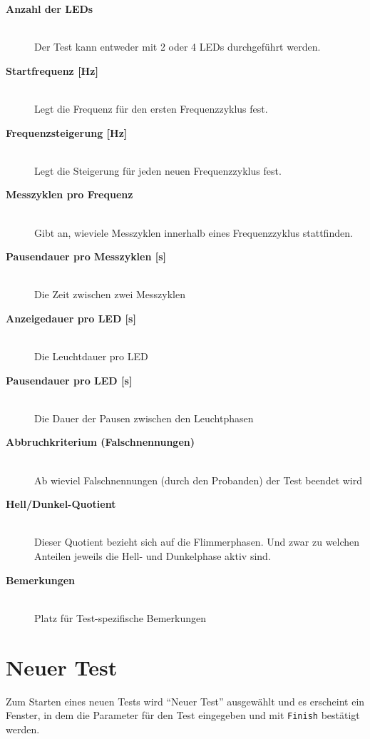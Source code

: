 \documentclass[11pt,accentcolor=tud2a,colorback,noheadingspace]{tudreport}
\begin{document}
\begin{description}
\item[{\textbf{Anzahl der LEDs}}] \hfill \\
Der Test kann entweder mit 2 oder 4 LEDs durchgeführt werden.

\item[{\textbf{Startfrequenz {[}Hz{]}}}] \hfill \\
Legt die Frequenz für den ersten Frequenzzyklus fest.

\item[{\textbf{Frequenzsteigerung {[}Hz{]}}}] \hfill \\
Legt die Steigerung für jeden neuen Frequenzzyklus fest.

\item[{\textbf{Messzyklen pro Frequenz}}] \hfill \\
Gibt an, wieviele Messzyklen innerhalb eines Frequenzzyklus stattfinden.

\item[{\textbf{Pausendauer pro Messzyklen {[}s{]}}}] \hfill \\
Die Zeit zwischen zwei Messzyklen

\item[{\textbf{Anzeigedauer pro LED {[}s{]}}}] \hfill \\
Die Leuchtdauer pro LED

\item[{\textbf{Pausendauer pro LED {[}s{]}}}] \hfill \\
Die Dauer der Pausen zwischen den Leuchtphasen

\item[{\textbf{Abbruchkriterium (Falschnennungen)}}] \hfill \\
Ab wieviel Falschnennungen (durch den Probanden) der Test beendet wird

\item[{\textbf{Hell/Dunkel-Quotient}}] \hfill \\
Dieser Quotient bezieht sich auf die Flimmerphasen. Und zwar zu welchen Anteilen jeweils die Hell- und Dunkelphase aktiv sind.

\item[{\textbf{Bemerkungen}}] \hfill \\
Platz für Test-spezifische Bemerkungen

\end{description}


\section{Neuer Test}
\label{tests:neuer-test}\label{tests:test-new}
Zum Starten eines neuen Tests wird ``Neuer Test'' ausgewählt und es erscheint ein Fenster, in dem die Parameter für den Test eingegeben und mit \texttt{Finish} bestätigt werden.
\end{document}
